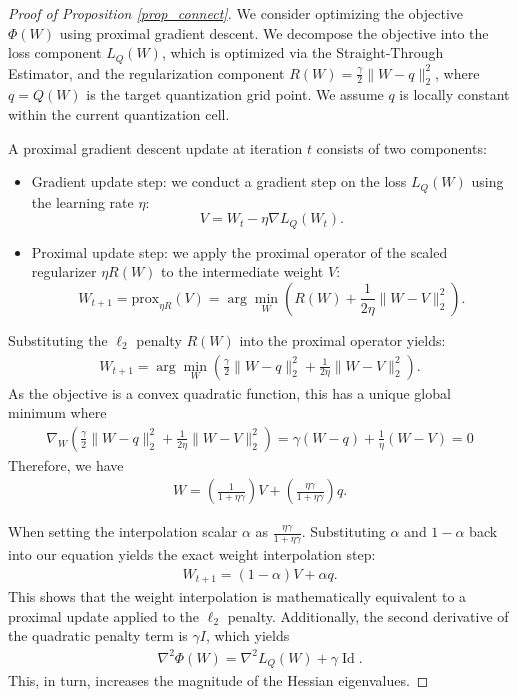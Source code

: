 \documentclass{article}
\theoremstyle{definition}
\newcommand{\norm}[1]{\|#1\|}
\DeclareMathOperator{\id}{Id}
\begin{document}
\begin{proof}[Proof of Proposition \ref{prop_connect}]
We consider optimizing the objective $\Phi(W)$ using proximal gradient descent. We decompose the objective into the loss component $L_Q(W)$, which is optimized via the Straight-Through Estimator, and the regularization component $R(W) = \frac{\gamma}{2} \norm{W - q}_2^2$, where $q = Q(W)$ is the target quantization grid point. We assume $q$ is locally constant within the current quantization cell.

A proximal gradient descent update at iteration $t$ consists of two components: 
\begin{itemize}
    \item Gradient update step: we conduct a gradient step on the loss $L_Q(W)$ using the learning rate $\eta$: 
    \[V = W_t - \eta \nabla L_Q(W_t).\]
    \item Proximal update step: we apply the proximal operator of the scaled regularizer $\eta R(W)$ to the intermediate weight $V$:
    \[W_{t+1} = \text{prox}_{\eta R}(V) = \arg\min_W \left( R(W) + \frac{1}{2\eta} \|W - V\|_2^2 \right).\]
\end{itemize} 

Substituting the $\ell_2$ penalty $R(W)$ into the proximal operator yields:
\begin{align*}
W_{t+1} = \arg\min_W \left( \frac{\gamma}{2} \norm{W - q}_2^2 + \frac{1}{2\eta} \norm{W - V}_2^2 \right).    
\end{align*}
As the objective is a convex quadratic function, this has a unique global minimum where 
\begin{align*}
\nabla_W \left( \frac{\gamma}{2} \|W - q\|_2^2 + \frac{1}{2\eta} \|W - V\|_2^2 \right) = \gamma(W - q) + \frac{1}{\eta}(W - V) = 0    
\end{align*}
Therefore, we have
\begin{align*}
W = \left( \frac{1}{1 + \eta \gamma} \right) V + \left( \frac{\eta \gamma}{1 + \eta \gamma} \right) q. 
\end{align*}

When setting the interpolation scalar $\alpha$ as $\frac{\eta \gamma}{1 + \eta \gamma}$. Substituting $\alpha$ and $1 - \alpha$ back into our equation yields the exact weight interpolation step:
\begin{align*}
W_{t+1} = (1 - \alpha) V + \alpha q.     
\end{align*}
This shows that the weight interpolation is mathematically equivalent to a proximal update applied to the $\ell_2$ penalty.
Additionally, the second derivative of the quadratic penalty term is $\gamma I$, which yields
\begin{align*}
\nabla^2 \Phi(W) = \nabla^2 L_Q(W) + \gamma \id.     
\end{align*}
This, in turn, increases the magnitude of the Hessian eigenvalues.
\end{proof}
\end{document}
